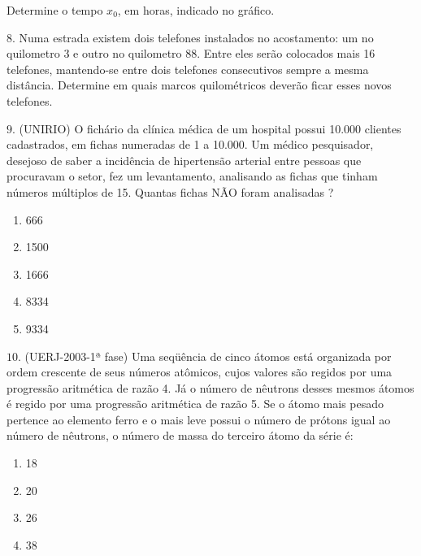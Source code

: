 \begin{center}\end{center}
Determine o tempo \(x_{0}\), em horas, indicado no gráfico.

\(8.\) Numa estrada existem dois telefones instalados no acostamento: um no quilometro 3 e outro no quilometro 88. Entre eles serão colocados mais 16 telefones, mantendo-se entre dois telefones consecutivos sempre a mesma distância. Determine em quais marcos quilométricos deverão ficar esses novos telefones.

\(9.\) (UNIRIO) O fichário da clínica médica de um hospital possui 10.000 clientes cadastrados, em fichas numeradas de 1 a 10.000. Um médico pesquisador, desejoso de saber a incidência de hipertensão arterial entre pessoas que procuravam o setor, fez um levantamento, analisando as fichas que tinham números múltiplos de 15. Quantas fichas NÃO foram analisadas ?
\begin{enumerate}
\item {} 
666

\item {} 
1500

\item {} 
1666

\item {} 
8334

\item {} 
9334

\end{enumerate}

\(10.\) (UERJ-2003-1ª fase) Uma seqüência de cinco átomos está organizada por ordem crescente de seus números atômicos, cujos valores são regidos por uma progressão aritmética de razão 4. Já o número de nêutrons desses mesmos átomos é regido por uma progressão aritmética de razão 5.
Se o átomo mais pesado pertence ao elemento ferro e o mais leve possui o número de prótons igual ao número de nêutrons, o número de massa do terceiro átomo da série é:
\begin{enumerate}
\item {} 
18

\item {} 
20

\item {} 
26

\item {} 
38

\end{enumerate}

